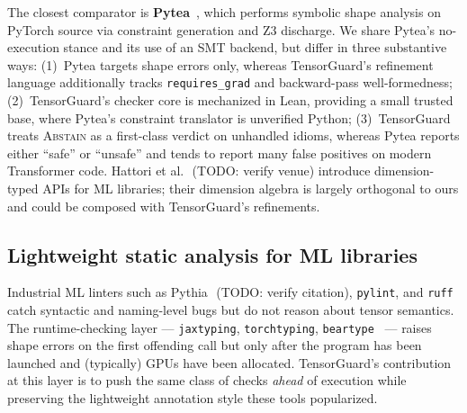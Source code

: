 The closest comparator is \textbf{Pytea}~\citep{lee2020pytea}, which
performs symbolic shape analysis on PyTorch source via constraint
generation and Z3 discharge. We share Pytea's no-execution stance
and its use of an SMT backend, but differ in three substantive ways:
(1)~Pytea targets shape errors only, whereas TensorGuard's refinement
language additionally tracks \texttt{requires\_grad} and
backward-pass well-formedness; (2)~TensorGuard's checker core is
mechanized in Lean, providing a small trusted base, where Pytea's
constraint translator is unverified Python; (3)~TensorGuard treats
\textsc{Abstain} as a first-class verdict on unhandled idioms,
whereas Pytea reports either ``safe'' or ``unsafe'' and tends to
report many false positives on modern Transformer code.
Hattori et al.~\citep{hattori2023dimension}\,(TODO: verify venue)
introduce dimension-typed APIs for ML libraries; their dimension
algebra is largely orthogonal to ours and could be composed with
TensorGuard's refinements.

\subsection{Lightweight static analysis for ML libraries}

Industrial ML linters such as Pythia~\citep{pythia}\,(TODO: verify
citation), \texttt{pylint}, and \texttt{ruff}~\citep{ruff} catch
syntactic and naming-level bugs but do not reason about tensor
semantics. The runtime-checking layer ---
\texttt{jaxtyping}, \texttt{torchtyping},
\texttt{beartype}~\citep{beartype} --- raises shape errors on the
first offending call but only after the program has been launched
and (typically) GPUs have been allocated. TensorGuard's
contribution at this layer is to push the same class of checks
\emph{ahead} of execution while preserving the lightweight
annotation style these tools popularized.


